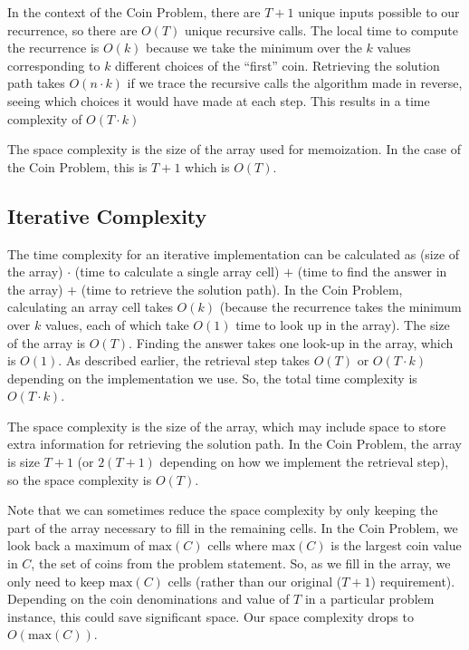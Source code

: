 \documentclass[11pt]{article}
\DeclareRobustCommand{\bigO}{%
    O
}
\begin{document}
In the context of the Coin Problem, there are $T+1$ unique inputs possible to our recurrence, so there are $\bigO(T)$ unique recursive calls. The local time to compute the recurrence is $\bigO(k)$ because we take the minimum over the $k$ values corresponding to $k$ different choices of the ``first'' coin. Retrieving the solution path takes $\bigO(n \cdot k)$ if we trace the recursive calls the algorithm made in reverse, seeing which choices it would have made at each step. This results in a time complexity of $\bigO(T \cdot k)$

The space complexity is the size of the array used for memoization. In the case of the Coin Problem, this is $T+1$ which is $\bigO(T)$.

\subsection*{Iterative Complexity}
The time complexity for an iterative implementation can be calculated as (size of the array) $\cdot$ (time to calculate a single array cell) $+$ (time to find the answer in the array) $+$ (time to retrieve the solution path). In the Coin Problem, calculating an array cell takes $\bigO(k)$ (because the recurrence takes the minimum over $k$ values, each of which take $\bigO(1)$ time to look up in the array). The size of the array is $\bigO(T)$. Finding the answer takes one look-up in the array, which is $\bigO(1)$. As described earlier, the retrieval step takes $\bigO(T)$ or $\bigO(T \cdot k)$ depending on the implementation we use. So, the total time complexity is $\bigO(T \cdot k)$.

The space complexity is the size of the array, which may include space to store extra information for retrieving the solution path. In the Coin Problem, the array is size $T+1$ (or $2(T+1)$ depending on how we implement the retrieval step), so the space complexity is $\bigO(T)$.

Note that we can sometimes reduce the space complexity by only keeping the part of the array necessary to fill in the remaining cells. In the Coin Problem, we look back a maximum of $\mathrm{max}(C)$ cells where $\mathrm{max}(C)$ is the largest coin value in $C$, the set of coins from the problem statement. So, as we fill in the array, we only need to keep $\mathrm{max}(C)$ cells (rather than our original ($T+1$) requirement). Depending on the coin denominations and value of $T$ in a particular problem instance, this could save significant space. Our space complexity drops to $\bigO(\mathrm{max}(C))$.
\end{document}
